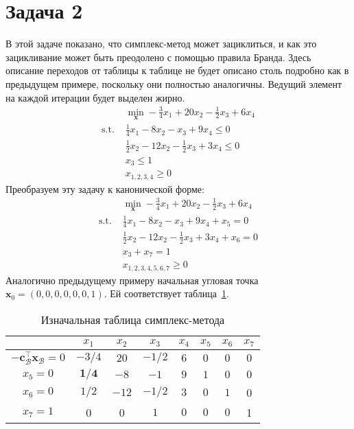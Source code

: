\documentclass[12pt]{article}
\newcommand{\bx}{\mathbf{x}}
\begin{document}
\section{Задача 2}
В этой задаче показано, что симплекс-метод может зациклиться, и как это зацикливание может быть преодолено с помощью правила Бранда. 
Здесь описание переходов от таблицы к таблице не будет описано столь подробно как в предыдущем примере, поскольку они полностью аналогичны. 
Ведущий элемент на каждой итерации будет выделен жирно.
\begin{equation*}
\begin{split}
& \min_{\bx} -\frac{3}{4}x_1 + 20x_2 - \frac{1}{2}x_3 + 6x_4\\
\text{s.t. } & \frac{1}{4}x_1 - 8x_2 - x_3 + 9x_4 \leq 0\\
& \frac{1}{2}x_2 - 12x_2 - \frac{1}{2}x_3 + 3x_4 \leq 0\\
& x_3 \leq 1\\
& x_{1,2,3,4} \geq 0
\end{split}
\end{equation*}
Преобразуем эту задачу к канонической форме:
\begin{equation*}
\begin{split}
& \min_{\bx} -\frac{3}{4}x_1 + 20x_2 - \frac{1}{2}x_3 + 6x_4\\
\text{s.t. } & \frac{1}{4}x_1 - 8x_2 - x_3 + 9x_4 + x_5 = 0\\
& \frac{1}{2}x_2 - 12x_2 - \frac{1}{2}x_3 + 3x_4 + x_6 = 0\\
& x_3 + x_7 = 1\\
& x_{1,2,3,4,5,6,7} \geq 0
\end{split}
\end{equation*}
Аналогично предыдущему примеру начальная угловая точка $\bx_0 = (0,0,0,0, 0,0,1)$.
Ей соответствует таблица~\ref{tab::simplex_20}.

\begin{table}[!ht]
\centering
\caption{Изначальная таблица симплекс-метода}
\begin{tabular}{|c|ccccccc|}
\hline
& $x_1$ & $x_2$ & $x_3$ & $x_4$ & $x_5$ & $x_6$ & $x_7$\\
\hline
$-\mathbf{c}_{\mathcal{B}}^{\top}\bx_{\mathcal{B}} = 0$ & $-3/4$ & $20$ & $-1/2$ & $6$ & $0$ & $0$ & $0$ \\
\hline
$x_5 = 0$ & $\mathbf{1/4}$ & $-8$ & $-1$ & $9$ & $1$ & $0$ & $0$ \\
$x_6 = 0$ & $1/2$ & $-12$ & $-1/2$ & $3$ & $0$ & $1$ & 0 \\
$x_7 = 1$ & 0 & 0 & $1$ & $0$ & $0$ & $0$ & 1 \\
\hline
\end{tabular}
\label{tab::simplex_20}
\end{table}
\end{document}
